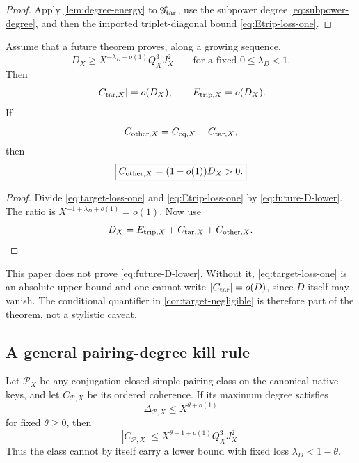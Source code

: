 \begin{proof}
Apply \cref{lem:degree-energy} to
\(\mathscr G_{\mathrm{tar}}\), use the subpower degree
\eqref{eq:subpower-degree}, and then the imported triplet-diagonal
bound \eqref{eq:Etrip-loss-one}.
\end{proof}

\begin{corollary}
\label{cor:target-negligible}
Assume that a future theorem proves, along a growing sequence,
\begin{equation}
 D_X
 \ge
 X^{-\lambda_D+o(1)}Q_X^3J_X^2
 \qquad\text{for a fixed }0\le\lambda_D<1.
\label{eq:future-D-lower}
\end{equation}
Then
\begin{equation}
 |C_{\mathrm{tar},X}|=o(D_X),\qquad
 E_{{\rm trip},X}=o(D_X).
\label{eq:target-diagonal-negligible}
\end{equation}
If
\[
 C_{{\rm other},X}
 =
 C_{\mathrm{eq},X}-C_{\mathrm{tar},X},
\]
then
\begin{equation}
 \boxed{
 C_{{\rm other},X}=(1-o(1))D_X>0.}
\label{eq:other-carries-D}
\end{equation}
\end{corollary}

\begin{proof}
Divide \eqref{eq:target-loss-one} and
\eqref{eq:Etrip-loss-one} by \eqref{eq:future-D-lower}.  The ratio is
\(X^{-1+\lambda_D+o(1)}=o(1)\).  Now use
\[
 D_X
 =
 E_{{\rm trip},X}
 +C_{\mathrm{tar},X}
 +C_{{\rm other},X}.
\]
\end{proof}

\begin{remark}
\label{rem:conditional-oD}
This paper does not prove \eqref{eq:future-D-lower}.  Without it,
\eqref{eq:target-loss-one} is an absolute upper bound and one cannot
write \(|C_{\mathrm{tar}}|=o(D)\), since \(D\) itself may vanish.  The
conditional quantifier in
\cref{cor:target-negligible} is therefore part of the theorem, not a
stylistic caveat.
\end{remark}

\subsection{A general pairing-degree kill rule}

\begin{corollary}
\label{cor:general-degree-barrier}
Let \(\mathscr P_X\) be any conjugation-closed simple pairing class on
the canonical native keys, and let \(C_{\mathscr P,X}\) be its ordered
coherence.  If its maximum degree satisfies
\[
 \Delta_{\mathscr P,X}\le X^{\theta+o(1)}
\]
for fixed \(\theta\ge0\), then
\begin{equation}
 |C_{\mathscr P,X}|
 \le
 X^{\theta-1+o(1)}Q_X^3J_X^2.
\label{eq:general-degree-barrier}
\end{equation}
Thus the class cannot by itself carry a lower bound with fixed loss
\(\lambda_D<1-\theta\).
\end{corollary}

